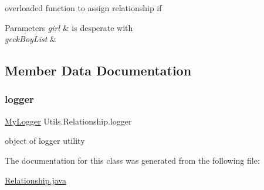 overloaded function to assign relationship if 
\begin{DoxyParams}{Parameters}
{\em girl} & is desperate with \\
\hline
{\em geek\+Boy\+List} & \\
\hline
\end{DoxyParams}


\subsection{Member Data Documentation}
\mbox{\label{class_utils_1_1_relationship_a9035f9009d2786c52785a1a1f230e8ae}} 
\subsubsection{\texorpdfstring{logger}{logger}}
{\footnotesize\ttfamily \hyperlink{class_utils_1_1_my_logger}{My\+Logger} Utils.\+Relationship.\+logger}

object of logger utility 

The documentation for this class was generated from the following file\+:\begin{DoxyCompactItemize}
\item 
\hyperlink{_relationship_8java}{Relationship.\+java}\end{DoxyCompactItemize}
